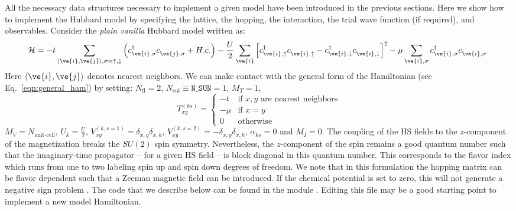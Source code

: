 

All the necessary data structures necessary to implement a given model have been introduced in the previous sections. Here we show how to implement the Hubbard model  by specifying the lattice, the hopping, the interaction, the trial wave function  (if  required), and  observables.  Consider  the  \textit{plain vanilla}  Hubbard model  written as: 
\begin{equation}
\label{eqn_hubbard_Mz}
\mathcal{H}=
- t 
\sum\limits_{\langle \ve{i}, \ve{j} \rangle,  \sigma={\uparrow,\downarrow}} 
  \left(  c^{\dagger}_{\ve{i}, \sigma} c^{\phantom\dagger}_{\ve{j},\sigma}  + H.c. \right) 
- \frac{U}{2}\sum\limits_{\ve{i}}\left[
c^{\dagger}_{\ve{i}, \uparrow} c^{\phantom\dagger}_{\ve{i}, \uparrow}  -   c^{\dagger}_{\ve{i}, \downarrow} c^{\phantom\dagger}_{\ve{i}, \downarrow}  \right]^{2}   
-  \mu \sum_{\ve{i},\sigma } c^{\dagger}_{\ve{i}, \sigma}  c^{\phantom\dagger}_{\ve{i},\sigma}. 
\end{equation} 
Here $ \langle \ve{i}, \ve{j} \rangle $    denotes nearest neighbors. 
We can make contact with the general form of the Hamiltonian  (see Eq.~\ref{eqn:general_ham}) by setting: 
$N_{\mathrm{fl}} = 2$, $N_{\mathrm{col}} \equiv \texttt{N\_SUN}     =1 $, 
 $M_T    =    1$, 
 \begin{equation}
  T^{(ks)}_{x y}   = 
  \left\{ 
 \begin{array}{ll}
       -t         & \text{if } x,y \text{ are nearest neighbors} \\
       -\mu    & \text{if } x = y \\
       0         &  \text{otherwise}
 \end{array}
  \right.
 \end{equation}
 $M_V   =  N_{\text{unit-cell}} $,  $U_{k}       =   \frac{U}{2}$, 
 $V_{x y}^{(k, s=1)} =  \delta_{x,y} \delta_{x,k}  $,  $V_{x y}^{(k, s=2)} =  - \delta_{x,y} \delta_{x,k}  $,  $\alpha_{ks}   = 0  $ and $M_I       = 0 $.   
 The coupling of the HS fields to the $z$-component of   the magnetization breaks the $SU(2)$ spin symmetry. Nevertheless, the $z$-component of the spin remains a good quantum number such that the imaginary-time propagator -- for a given HS field -- is block  diagonal in this quantum number. This corresponds to the flavor index  which runs from one to two  labeling spin up and spin down  degrees of freedom.     We note that  in this formulation the  hopping matrix can be flavor dependent such that a Zeeman  magnetic field can be introduced.  If the chemical potential is set to zero, this will not generate a negative sign problem \cite{Wu04,Milat04,Bercx09}.    
The code that we describe below  can be found in the module .   Editing this file may be a good starting point to implement a new model Hamiltonian. 

